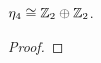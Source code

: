 \begin{ejercicio}\label{ej:42}
  $\eta_4\cong\mathbb{Z}_2\oplus\mathbb{Z}_2$.
\end{ejercicio}
\begin{proof}%

\end{proof}%

